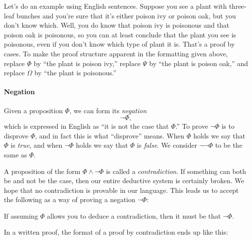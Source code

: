 \documentclass[12pt]{article}
\newcommand{\AND}{\wedge}
\newcounter{rule}
\def\putRuleNumber{\refstepcounter{rule}\therule}
\newcommand{\indented}[1]{\begin{adjustwidth}{1em}{}#1\end{adjustwidth}}
\newcommand{\THM}[2]{\textbf{Theorem:} #1\\[0.5em]\textit{Proof:} #2\qed}
\newcommand{\RULE}[2]{\begin{tcolorbox}[title=Rule \putRuleNumber: #1,colbacktitle=white,coltitle=black,colback=white]#2\end{tcolorbox}}
\def\pA{\Phi}
\def\pB{\Psi}
\def\pC{\Omega}
\begin{document}
Let's do an example using English sentences.
Suppose you see a plant with three-leaf bunches and you're sure that it's either poison ivy or poison oak, but you don't know which.
Well, you do know that poison ivy is poisonous and that poison oak is poisonous, so you can at least conclude that the plant you see is poisonous, even
if you don't know which type of plant it is.
That's a proof by cases.
To make the proof structure apparent in
the formatting given above, replace $\pA$ by ``the plant is poison ivy,'' replace $\pB$ by ``the plant is poison oak,'' and replace $\pC$ by ``the plant is poisonous.''


\paragraph{Negation}
Given a proposition $\pA$, we can form its \emph{negation}
$$
\neg \pA,
$$
which is expressed in English as ``it is not the case that $\pA$.''
To prove $\neg\pA$ is to disprove $\pA$, and in fact this is what ``disprove'' means.
When $\pA$ holds we say that $\pA$ is \emph{true}, and when $\neg\pA$ holds we say that $\pA$ is \emph{false}.
We consider $\neg\neg\pA$ to be the same as $\pA$.

A proposition of the form $\pA\AND\neg\pA$ is called a \emph{contradiction}.
If something can both be and not be the case, then our entire deductive system is certainly broken.
We hope that no contradiction is provable in our language.
This leads us to accept the following as a way of proving a negation $\neg\pA$:
\RULE{Proof by contradiction}{
If assuming $\pA$ allows you to deduce a contradiction, then it must be that $\neg\pA$.
}
In a written proof, the format of a proof by contradiction ends up like this:
\end{document}
